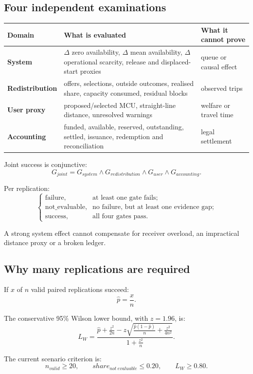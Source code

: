 \documentclass[11pt,a4paper]{article}
\begin{document}
\subsection{Four independent examinations}

\begin{longtable}{>{\bfseries}p{3.1cm}p{8.4cm}p{3.5cm}}
\toprule Domain & What is evaluated & What it cannot prove \\\midrule\endhead
System & $\Delta$ zero availability, $\Delta$ mean availability, $\Delta$ operational scarcity, release and displaced-start proxies & queue or causal effect \\
Redistribution & offers, selections, outside outcomes, realised share, capacity consumed, residual blocks & observed trips \\
User proxy & proposed/selected MCU, straight-line distance, unresolved warnings & welfare or travel time \\
Accounting & funded, available, reserved, outstanding, settled, issuance, redemption and reconciliation & legal settlement \\
\bottomrule
\end{longtable}

Joint success is conjunctive:
\[
G_{joint}=G_{system}\land G_{redistribution}
\land G_{user}\land G_{accounting}.
\]

Per replication:
\[
\begin{cases}
\text{failure}, & \text{at least one gate fails};\\
\text{not\_evaluable}, & \text{no failure, but at least one evidence gap};\\
\text{success}, & \text{all four gates pass}.
\end{cases}
\]

A strong system effect cannot compensate for receiver overload, an impractical distance proxy or a broken ledger.

\subsection{Why many replications are required}

If $x$ of $n$ valid paired replications succeed:
\[
\widehat p=\frac{x}{n}.
\]

The conservative 95\% Wilson lower bound, with $z=1.96$, is:
\[
L_W=
\frac{
\widehat p+\frac{z^2}{2n}
-z\sqrt{\frac{\widehat p(1-\widehat p)}{n}+\frac{z^2}{4n^2}}
}{1+\frac{z^2}{n}}.
\]

The current scenario criterion is:
\[
n_{valid}\ge20,
\qquad
share_{not\ evaluable}\le0.20,
\qquad
L_W\ge0.80.
\]
\end{document}

